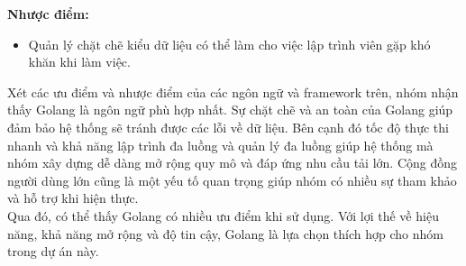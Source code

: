 \textbf{Nhược điểm:}
\begin{itemize}
    \item Quản lý chặt chẽ kiểu dữ liệu có thể làm cho việc lập trình viên gặp khó khăn khi làm việc.
\end{itemize}

\hspace{0.5cm}Xét các ưu điểm và nhược điểm của các ngôn ngữ và framework trên, nhóm nhận thấy Golang là ngôn ngữ phù hợp nhất. Sự chặt chẽ và an toàn của Golang giúp đảm bảo hệ thống sẽ tránh được các lỗi về dữ liệu. Bên cạnh đó tốc độ thực thi nhanh và khả năng lập trình đa luồng và quản lý đa luồng giúp hệ thống mà nhóm xây dựng dễ dàng mở rộng quy mô và đáp ứng nhu cầu tải lớn. Cộng đồng người dùng lớn cũng là một yếu tố quan trọng giúp nhóm có nhiều sự tham khảo và hỗ trợ khi hiện thực.\\



\hspace{0.5cm}Qua đó, có thể thấy Golang có nhiều ưu điểm khi sử dụng. Với lợi thế về hiệu năng, khả năng mở rộng và độ tin cậy, Golang là lựa chọn thích hợp cho nhóm trong dự án này.